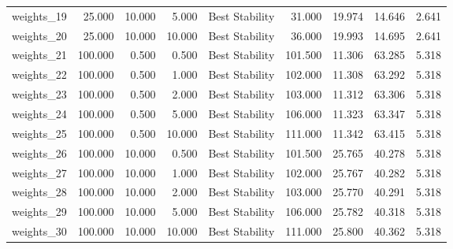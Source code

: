\begin{table}
{\begin{tabular}{lrrrlrrrr}
 weights\_19 &             25.000 &         10.000 &             5.000 &   Best Stability &                       31.000 &                             19.974 &                           14.646 &                        2.641 \\
 weights\_20 &             25.000 &         10.000 &            10.000 &   Best Stability &                       36.000 &                             19.993 &                           14.695 &                        2.641 \\
 weights\_21 &            100.000 &          0.500 &             0.500 &   Best Stability &                      101.500 &                             11.306 &                           63.285 &                        5.318 \\
 weights\_22 &            100.000 &          0.500 &             1.000 &   Best Stability &                      102.000 &                             11.308 &                           63.292 &                        5.318 \\
 weights\_23 &            100.000 &          0.500 &             2.000 &   Best Stability &                      103.000 &                             11.312 &                           63.306 &                        5.318 \\
 weights\_24 &            100.000 &          0.500 &             5.000 &   Best Stability &                      106.000 &                             11.323 &                           63.347 &                        5.318 \\
 weights\_25 &            100.000 &          0.500 &            10.000 &   Best Stability &                      111.000 &                             11.342 &                           63.415 &                        5.318 \\
 weights\_26 &            100.000 &         10.000 &             0.500 &   Best Stability &                      101.500 &                             25.765 &                           40.278 &                        5.318 \\
 weights\_27 &            100.000 &         10.000 &             1.000 &   Best Stability &                      102.000 &                             25.767 &                           40.282 &                        5.318 \\
 weights\_28 &            100.000 &         10.000 &             2.000 &   Best Stability &                      103.000 &                             25.770 &                           40.291 &                        5.318 \\
 weights\_29 &            100.000 &         10.000 &             5.000 &   Best Stability &                      106.000 &                             25.782 &                           40.318 &                        5.318 \\
 weights\_30 &            100.000 &         10.000 &            10.000 &   Best Stability &                      111.000 &                             25.800 &                           40.362 &                        5.318 \\
\bottomrule
\end{tabular}
}

\end{table}
